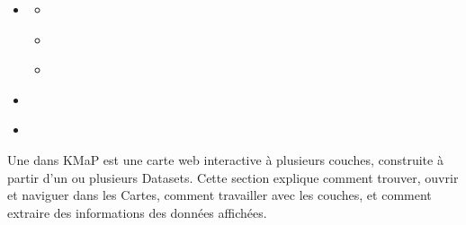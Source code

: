 \documentclass[letterpaper,10pt,english]{sphinxmanual}
\begin{document}
\begin{sphinxcontents}
\begin{itemize}
\begin{itemize}
\item {} 
\sphinxAtStartPar
{}\label{\detokenize{fr/04_explorer_cartes:id18}}{\hyperref[\detokenize{fr/04_explorer_cartes:mesure-de-surface}]{}}

\end{itemize}

\item {} 
\sphinxAtStartPar
{}\label{\detokenize{fr/04_explorer_cartes:id19}}{\hyperref[\detokenize{fr/04_explorer_cartes:imprimer-et-exporter-la-vue-de-la-carte}]{}}
\begin{itemize}
\item {} 
\sphinxAtStartPar
{}\label{\detokenize{fr/04_explorer_cartes:id20}}{\hyperref[\detokenize{fr/04_explorer_cartes:imprimer}]{}}

\item {} 
\sphinxAtStartPar
{}\label{\detokenize{fr/04_explorer_cartes:id21}}{\hyperref[\detokenize{fr/04_explorer_cartes:partager-permalien}]{}}

\item {} 
\sphinxAtStartPar
{}\label{\detokenize{fr/04_explorer_cartes:id22}}{\hyperref[\detokenize{fr/04_explorer_cartes:integrer-embed}]{}}

\end{itemize}

\item {} 
\sphinxAtStartPar
{}\label{\detokenize{fr/04_explorer_cartes:id23}}{\hyperref[\detokenize{fr/04_explorer_cartes:enregistrer-les-modifications-d-une-carte}]{}}

\item {} 
\sphinxAtStartPar
{}\label{\detokenize{fr/04_explorer_cartes:id24}}{\hyperref[\detokenize{fr/04_explorer_cartes:creer-une-nouvelle-carte}]{}}

\end{itemize}
\end{sphinxcontents}

\sphinxAtStartPar
Une  dans KMaP est une carte web interactive à plusieurs couches, construite
à partir d’un ou plusieurs Datasets. Cette section explique comment trouver, ouvrir et
naviguer dans les Cartes, comment travailler avec les couches, et comment extraire des
informations des données affichées.
\end{document}
